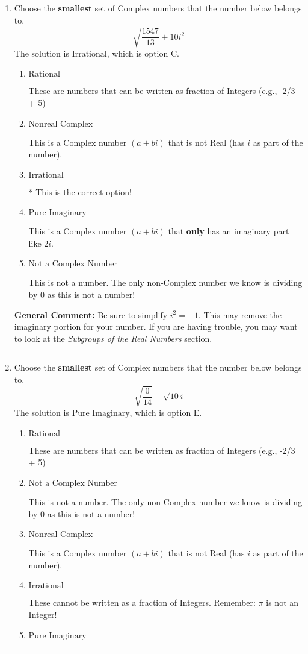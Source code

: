 \documentclass{extbook}[14pt]
\newcommand{\litem}[1]{\item #1

\rule{\textwidth}{0.4pt}}
\begin{document}
\begin{enumerate}\litem{
Choose the \textbf{smallest} set of Complex numbers that the number below belongs to.
\[ \sqrt{\frac{1547}{13}}+10i^2 \]The solution is \( \text{Irrational} \), which is option C.\begin{enumerate}[label=\Alph*.]
\item \( \text{Rational} \)

These are numbers that can be written as fraction of Integers (e.g., -2/3 + 5)
\item \( \text{Nonreal Complex} \)

This is a Complex number $(a+bi)$ that is not Real (has $i$ as part of the number).
\item \( \text{Irrational} \)

* This is the correct option!
\item \( \text{Pure Imaginary} \)

This is a Complex number $(a+bi)$ that \textbf{only} has an imaginary part like $2i$.
\item \( \text{Not a Complex Number} \)

This is not a number. The only non-Complex number we know is dividing by 0 as this is not a number!
\end{enumerate}

\textbf{General Comment:} Be sure to simplify $i^2 = -1$. This may remove the imaginary portion for your number. If you are having trouble, you may want to look at the \textit{Subgroups of the Real Numbers} section.
}
\litem{
Choose the \textbf{smallest} set of Complex numbers that the number below belongs to.
\[ \sqrt{\frac{0}{14}}+\sqrt{10}i \]The solution is \( \text{Pure Imaginary} \), which is option E.\begin{enumerate}[label=\Alph*.]
\item \( \text{Rational} \)

These are numbers that can be written as fraction of Integers (e.g., -2/3 + 5)
\item \( \text{Not a Complex Number} \)

This is not a number. The only non-Complex number we know is dividing by 0 as this is not a number!
\item \( \text{Nonreal Complex} \)

This is a Complex number $(a+bi)$ that is not Real (has $i$ as part of the number).
\item \( \text{Irrational} \)

These cannot be written as a fraction of Integers. Remember: $\pi$ is not an Integer!
\item \( \text{Pure Imaginary} \)


\end{enumerate}}
\end{enumerate}
\end{document}
